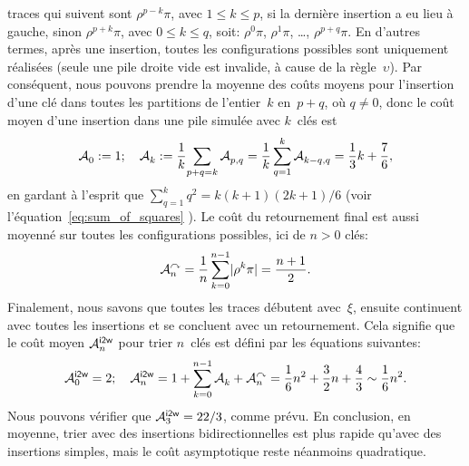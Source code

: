 traces qui suivent sont \(\rho^{p-k}\pi\), avec \(1 \leqslant k
\leqslant p\), si la dernière insertion a eu lieu à gauche, sinon
\(\rho^{p+k}\pi\), avec \(0 \leqslant k \leqslant q\), soit:
\(\rho^0\pi\), \(\rho^1\pi\), \ldots, \(\rho^{p+q}\pi\). En d'autres
termes, après une insertion, toutes les configurations possibles sont
uniquement réalisées (seule une pile droite vide est invalide, à cause
de la règle~\(\upsilon\)). Par conséquent, nous pouvons prendre la
moyenne des coûts moyens pour l'insertion d'une clé dans toutes les
partitions de l'entier~\(k\) en~\(p + q\), où \(q \neq 0\), donc le
coût moyen d'une insertion dans une pile simulée avec \(k\)~clés est
\begin{equation*}
\M{}{0} := 1;\quad
\M{}{k} := \frac{1}{k}\!\sum_{p+q=k}\M{}{p,q}
         = \frac{1}{k}\sum_{q=1}^{k}\M{}{k-q,q}
         = \frac{1}{3}k + \frac{7}{6},
\end{equation*}
en gardant à l'esprit que \(\sum_{q=1}^{k}{q^2} = k(k+1)(2k+1)/6\)
(voir l'équation~\eqref{eq:sum_of_squares}
). Le coût du retournement final est aussi
moyenné sur toutes les configurations possibles, ici de \(n>0\) clés:
\begin{equation*}
\M{\curvearrowright}{n} = \frac{1}{n}\sum_{k=0}^{n-1}\len{\rho^k\pi}
                        = \frac{n+1}{2}.
\end{equation*}
Finalement, nous savons que toutes les traces débutent avec~\(\xi\),
ensuite continuent avec toutes les insertions et se concluent avec un
retournement. Cela signifie que le coût moyen
\(\M{\fun{i2w}}{n}\) pour trier
\(n\)~clés est défini par les équations suivantes:
\begin{equation*}
\M{\fun{i2w}}{0} = 2;\quad
\M{\fun{i2w}}{n} = 1 + \sum_{k=0}^{n-1}{\M{}{k}} + \M{\curvearrowright}{n}
                 = \frac{1}{6}n^2 + \frac{3}{2}n + \frac{4}{3}
                 \sim \frac{1}{6}n^2.
\end{equation*}
Nous pouvons vérifier que \(\M{\fun{i2w}}{3} = 22/3\), comme prévu. En
conclusion, en moyenne, trier avec des insertions bidirectionnelles
est plus rapide qu'avec des insertions simples, mais le coût
asymptotique reste néanmoins quadratique.

